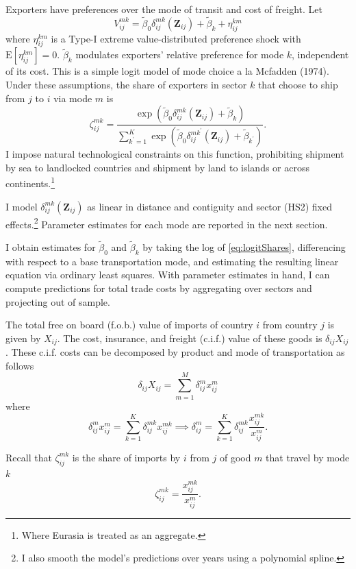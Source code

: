 \documentclass{puthesis}
\newcommand{\E}{\mathrm{E}}
\begin{document}
Exporters have preferences over the mode of transit and cost of freight.
Let \[
V_{ij}^{mk} = \tilde{\beta}_0 \delta_{ij}^{mk}(\bm{Z}_{ij}) + \tilde{\beta}_k + \eta_{ij}^{km}
\] where \(\eta_{ij}^{km}\) is a Type-I extreme value-distributed
preference shock with \(\E [\eta_{ij}^{km}] = 0\). \(\tilde{\beta}_k\)
modulates exporters' relative preference for mode \(k\), independent of
its cost. This is a simple logit model of mode choice a la Mcfadden
(1974). Under these assumptions, the share of exporters in sector \(k\)
that choose to ship from \(j\) to \(i\) via mode \(m\) is
\begin{equation} \label{eq:logitShares}
\zeta_{ij}^{m k} = \frac{\exp \left( \tilde{\beta}_0 \delta_{ij}^{mk}(\bm{Z}_{ij}) + \tilde{\beta}_k \right)}{\sum_{k^\prime=1}^K \exp \left( \tilde{\beta}_0 \delta_{ij}^{mk^\prime}(\bm{Z}_{ij}) + \tilde{\beta}_{k^\prime} \right)} .
\end{equation} I impose natural technological constraints on this
function, prohibiting shipment by sea to landlocked countries and
shipment by land to islands or across continents.\footnote{Where Eurasia
  is treated as an aggregate.}

I model \(\delta_{ij}^{mk}(\bm{Z}_{ij})\) as linear in distance and
contiguity and sector (HS2) fixed effects.\footnote{I also smooth the
  model's predictions over years using a polynomial spline.} Parameter
estimates for each mode are reported in the next section.

I obtain estimates for \(\tilde{\beta}_0\) and \(\tilde{\beta}_k\) by
taking the log of \ref{eq:logitShares}, differencing with respect to a
base transportation mode, and estimating the resulting linear equation
via ordinary least squares. With parameter estimates in hand, I can
compute predictions for total trade costs by aggregating over sectors
and projecting out of sample.

The total free on board (f.o.b.) value of imports of country \(i\) from
country \(j\) is given by \(X_{ij}\). The cost, insurance, and freight
(c.i.f.) value of these goods is \(\delta_{ij} X_{ij}\). These c.i.f.
costs can be decomposed by product and mode of transportation as follows
\[
\delta_{ij} X_{ij} = \sum_{m = 1}^M \delta_{ij}^m x_{ij}^m
\] where \[
\delta_{ij}^m x_{ij}^m = \sum_{k=1}^K \delta_{ij}^{m k} x_{ij}^{m k} \implies \delta_{ij}^m =  \sum_{k=1}^K \delta_{ij}^{m k} \frac{x_{ij}^{m k}}{x_{ij}^m} .
\]

Recall that \(\zeta_{ij}^{m k}\) is the share of imports by \(i\) from
\(j\) of good \(m\) that travel by mode \(k\) \[
\zeta_{ij}^{m k} = \frac{x_{ij}^{m k}}{x_{ij}^m} .
\]
\end{document}
